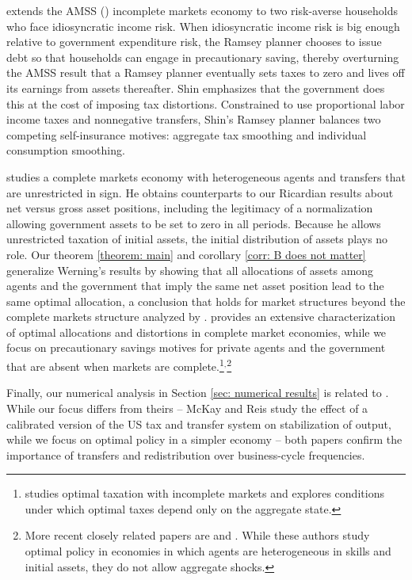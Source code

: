 \documentclass[thmsb,11pt]{article}
\begin{document}
\citet{shin2006ramsey} extends the AMSS  (\citet{Aiyagari2002}) incomplete markets economy to  two risk-averse households who
face idiosyncratic income risk. When idiosyncratic income risk is big enough
relative to government expenditure risk, the Ramsey planner
chooses to issue debt so that  households can  engage in precautionary
saving, thereby overturning the AMSS result that  a
 Ramsey planner  eventually sets taxes to zero and lives off its earnings from assets thereafter.
  Shin emphasizes that the
government does this at the cost of imposing tax distortions.
Constrained to use proportional labor income taxes and nonnegative
transfers, Shin's Ramsey planner balances two competing self-insurance
motives: aggregate tax smoothing and individual consumption smoothing.

\citet{Wer07a} studies a complete markets economy with heterogeneous agents
and transfers that are unrestricted in sign. He obtains counterparts to our Ricardian
results about net versus gross asset positions, including the legitimacy of a normalization allowing government
assets to be set to zero in all periods. Because he allows unrestricted
taxation of initial assets, the initial distribution of assets plays no
role. Our theorem \ref{theorem: main} and corollary \ref{corr: B does not matter}
generalize Werning's results by showing that all allocations of assets among
agents and the government that imply the same net asset position
lead to the same optimal allocation, a conclusion that holds for market
structures beyond the complete markets structure analyzed by \citeauthor{Wer07a}.
  \citet{Wer07a} provides an extensive
characterization of optimal allocations and distortions in complete market
economies, while we focus on precautionary savings motives for private
agents and the government that are absent when markets are complete.\footnote{%
\cite{Werning2012} studies optimal taxation with incomplete markets and explores
conditions under which optimal taxes depend only on the aggregate state.}$^,$\footnote{%
More recent closely related papers are \citet{Azzimonti2008,Azzimonti2008a} and \citet{Correia2010}. While these authors study optimal policy in
 economies in which agents are heterogeneous in skills and initial assets, they
  do not allow aggregate shocks.}

  Finally, our numerical analysis in Section \ref{sec: numerical results} is related to \citet{mckay2013}. While our focus differs from theirs -- McKay and Reis study the effect of a  calibrated version of the US tax and transfer system on stabilization of output, while we focus on optimal policy  in a  simpler economy -- both papers confirm the importance of transfers and redistribution over business-cycle frequencies.
\end{document}
